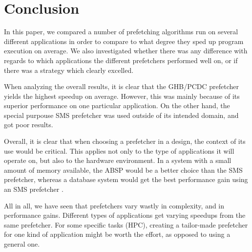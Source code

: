 
\section{Conclusion}
\label{sec:conclusion}

In this paper, we compared a number of prefetching algorithms run on
several different applications in order to compare to what degree they
sped up program execution on average. We also investigated whether
there was any difference with regards to which applications the
different prefetchers performed well on, or if there was a strategy
which clearly excelled.

When analyzing the overall results, it is clear that the GHB/PCDC prefetcher yields the highest speedup on average. However, this was mainly because of its superior performance on one particular application. On the other hand, the special purpouse SMS prefetcher was used outside of its intended domain, and got poor results.  

Overall, it is clear that when choosing a prefetcher in a design, the context of its use would be critical. This applies not only to the type of applications it will operate on, but also to the hardware environment. In a system with a small amount of memory available, the ABSP would be a better choice than the SMS prefetcher, whereas a database system would get the best performance gain using an SMS prefetcher \cite{sms-is-best}. 

All in all, we have seen that prefetchers vary wastly in complexity, and in performance gains. Different types of applications get varying speedups from the same prefetcher. For some specific tasks (HPC), creating a tailor-made prefetcher for one kind of application might be worth the effort, as opposed to using a general one.
